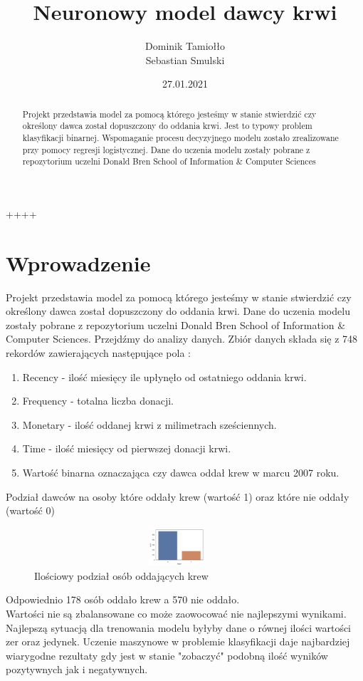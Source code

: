 \documentclass[11pt, a4paper, notitlepage]{report}
\author{
  Dominik Tamiołło \\
  Sebastian Smulski
}
\title{\textbf{Neuronowy model dawcy krwi}}
\date{27.01.2021}
\begin{document}
++++
\clearpage\maketitle
\thispagestyle{empty}
\begin{abstract}
	Projekt przedstawia model za pomocą którego jesteśmy w stanie stwierdzić czy określony dawca został dopuszczony do oddania krwi. Jest to typowy problem klasyfikacji binarnej. Wspomaganie procesu decyzyjnego modelu zostało zrealizowane przy pomocy regresji logistycznej. Dane do uczenia modelu zostały pobrane z repozytorium uczelni Donald Bren School of Information \& Computer Sciences
\end{abstract}

\clearpage \tableofcontents
\thispagestyle{empty}

\setcounter{page}{1}

\chapter{Wprowadzenie}

Projekt przedstawia model za pomocą którego jesteśmy w stanie stwierdzić czy określony dawca został dopuszczony do oddania krwi. Dane do uczenia modelu zostały pobrane z repozytorium uczelni Donald Bren School of Information \& Computer Sciences. Przejdźmy do analizy danych.
Zbiór danych składa się z 748 rekordów zawierających następujące pola : \\
\begin{enumerate}  
\item Recency - ilość miesięcy ile upłynęło od ostatniego oddania krwi. 
\item Frequency - totalna liczba donacji.
\item Monetary - ilość oddanej krwi z milimetrach sześciennych.
\item Time - ilość miesięcy od pierwszej donacji krwi.
\item Wartość binarna oznaczająca czy dawca oddał krew w marcu 2007 roku.
\end{enumerate}
\newpage
Podział dawców na osoby które oddały krew (wartość 1) oraz które nie oddały (wartość 0) \\
\begin{figure}[h!]
  \includegraphics[width=300pt,height=40pt]{graphics/sns}
  \caption{Ilościowy podział osób oddających krew}
  \label{fig:scale}
\end{figure}
Odpowiednio 178 osób oddało krew a 570 nie oddało. \\
Wartości nie są zbalansowane co może zaowocować nie najlepszymi wynikami. Najlepszą sytuacją dla trenowania modelu byłyby dane o równej ilości wartości zer oraz jedynek. Uczenie maszynowe w problemie klasyfikacji daje najbardziej wiarygodne rezultaty gdy jest w stanie "zobaczyć" podobną ilość wyników pozytywnych jak i negatywnych.
\end{document}
